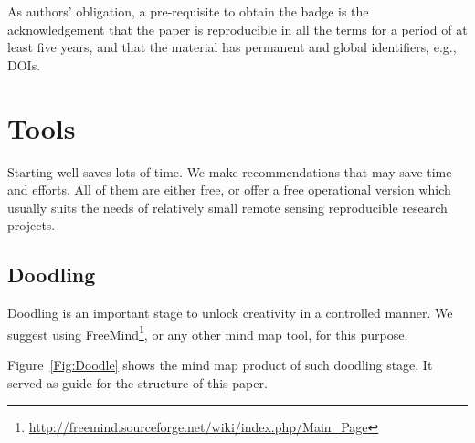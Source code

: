 \documentclass[journal,twoside]{IEEEtran}
\begin{document}
As authors' obligation, a pre-requisite to obtain the badge is the acknowledgement that the paper is reproducible in all the terms for a period of at least five years, and that the material has permanent and global identifiers, e.g., DOIs.

\section{Tools}

Starting well saves lots of time.
We make recommendations that may save time and efforts.
All of them are either free, or offer a free operational version which usually suits the needs of relatively small remote sensing reproducible research projects.

\subsection{Doodling}

Doodling is an important stage to unlock creativity in a controlled manner.
We suggest using FreeMind\footnote{\url{http://freemind.sourceforge.net/wiki/index.php/Main_Page}}, or any other mind map tool, for this purpose.

Figure~\ref{Fig:Doodle} shows the mind map product of such doodling stage.
It served as guide for the structure of this paper.
\end{document}
